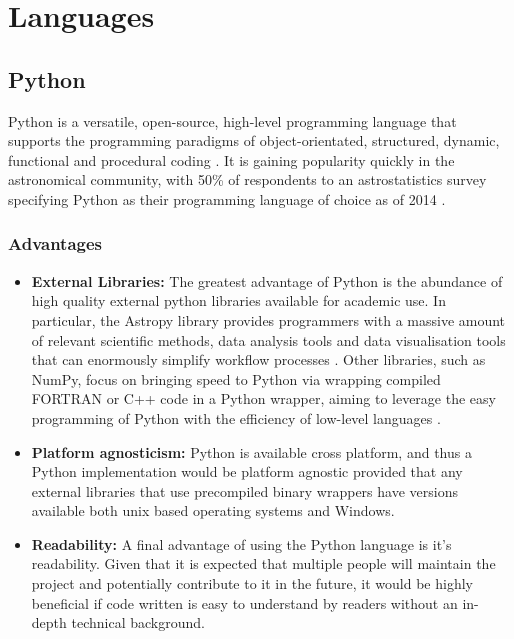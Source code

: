 \documentclass[titlesmallcaps, examinerscopy, copyrightpage]{uqthesis}
\begin{document}
\section{Languages}

\subsection{Python}

Python is a versatile, open-source, high-level programming language that supports the programming paradigms of object-orientated, structured, dynamic, functional and procedural coding \cite{Python}. It is gaining popularity quickly in the astronomical community, with 50\% of respondents to an astrostatistics survey specifying Python as their programming language of choice as of 2014 \cite{PythonPop}.

\subsubsection{Advantages}

\begin{itemize}
\item \textbf{External Libraries:} The greatest advantage of Python is the abundance of  high quality external python libraries available for academic use. In particular, the Astropy library provides programmers with a massive amount of relevant scientific methods, data analysis tools and data visualisation tools that can enormously simplify workflow processes \cite{astropy}. Other libraries, such as NumPy, focus on bringing speed to Python via wrapping compiled FORTRAN or C++ code in a Python wrapper, aiming to leverage the easy programming of Python with the efficiency of low-level languages \cite{numpy}.

\item \textbf{Platform agnosticism:} Python is available cross platform, and thus a Python implementation would be platform agnostic provided that any external libraries that use precompiled binary wrappers have versions available both unix based operating systems and Windows.

\item \textbf{Readability:} A final advantage of using the Python language is it's readability. Given that it is expected that multiple people will maintain the project and potentially contribute to it in the future, it would be highly beneficial if code written is easy to understand by readers without an in-depth technical background.
\end{itemize}
  
\end{document}
